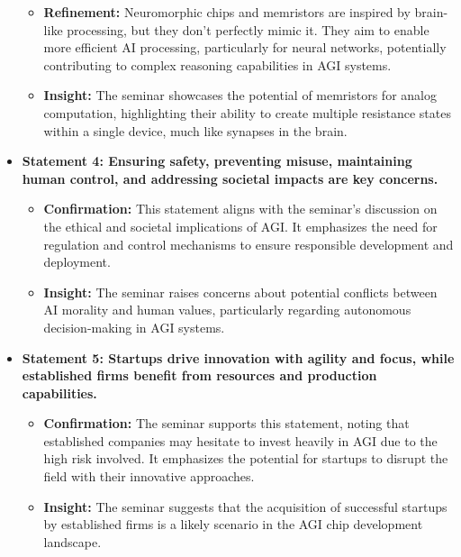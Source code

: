 \documentclass[
]{article}
\begin{document}
\begin{itemize}
\begin{itemize}
  \item
    \textbf{Refinement:} Neuromorphic chips and memristors are inspired
    by brain-like processing, but they don't perfectly mimic it. They
    aim to enable more efficient AI processing, particularly for neural
    networks, potentially contributing to complex reasoning capabilities
    in AGI systems.
  \item
    \textbf{Insight:} The seminar showcases the potential of memristors
    for analog computation, highlighting their ability to create
    multiple resistance states within a single device, much like
    synapses in the brain.
  \end{itemize}
\item
  \textbf{Statement 4: Ensuring safety, preventing misuse, maintaining
  human control, and addressing societal impacts are key concerns.}

  \begin{itemize}
  
  \item
    \textbf{Confirmation:} This statement aligns with the seminar's
    discussion on the ethical and societal implications of AGI. It
    emphasizes the need for regulation and control mechanisms to ensure
    responsible development and deployment.
  \item
    \textbf{Insight:} The seminar raises concerns about potential
    conflicts between AI morality and human values, particularly
    regarding autonomous decision-making in AGI systems.
  \end{itemize}
\item
  \textbf{Statement 5: Startups drive innovation with agility and focus,
  while established firms benefit from resources and production
  capabilities.}

  \begin{itemize}
  
  \item
    \textbf{Confirmation:} The seminar supports this statement, noting
    that established companies may hesitate to invest heavily in AGI due
    to the high risk involved. It emphasizes the potential for startups
    to disrupt the field with their innovative approaches.
  \item
    \textbf{Insight:} The seminar suggests that the acquisition of
    successful startups by established firms is a likely scenario in the
    AGI chip development landscape.
  \end{itemize}
\end{itemize}
\end{document}
